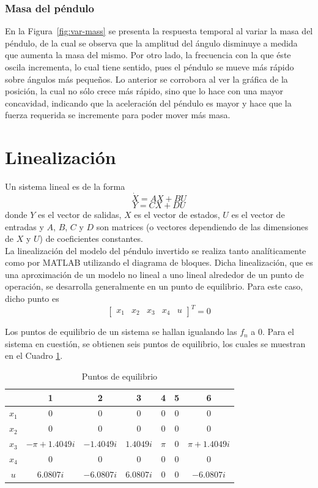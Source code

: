 \documentclass[journal]{IEEEtran}
\begin{document}
\subsubsection*{Masa del péndulo}
En la Figura~\ref{fig:var-mass} se presenta la respuesta temporal
al variar la masa del péndulo, de la cual se observa que la amplitud
del ángulo disminuye a medida que aumenta la masa del mismo. Por otro
lado, la frecuencia con la que éste oscila incrementa, lo cual tiene sentido,
pues el péndulo se mueve más rápido sobre ángulos más pequeños. Lo anterior se
corrobora al ver la gráfica de la posición, la cual no sólo crece más
rápido, sino que lo hace con una mayor concavidad, indicando que la
aceleración del péndulo es mayor y hace que la fuerza requerida
se incremente para poder mover más masa.


\section{Linealización}\label{sec:lin}

Un sistema lineal es de la forma
\[\dot{X}=AX+BU\]
\[Y=CX+DU\]
donde $Y$ es el vector de salidas, $X$ es el vector de estados, $U$ es el vector
de entradas y $A$, $B$, $C$ y $D$ son matrices (o vectores dependiendo de las
dimensiones de $X$ y $U$) de coeficientes constantes.\\

La linealización del modelo del péndulo invertido se realiza tanto analíticamente como por MATLAB utilizando el diagrama de bloques. Dicha linealización, que es una aproximación de un modelo no lineal a uno lineal alrededor de un punto de operación, se desarrolla generalmente en un punto de equilibrio. Para este caso, dicho punto es \[\begin{bmatrix}
x_1 & x_2 & x_3 & x_4 & u
\end{bmatrix}^T=0\]

Los puntos de equilibrio de un sistema se hallan igualando las $f_n$ a 0. Para el sistema en cuestión, se obtienen seis puntos de equilibrio, los cuales se muestran en el Cuadro \ref{tab: ptoseq}.


\begin{table}[ht!]
  \centering
  \caption{Puntos de equilibrio}\label{tab: ptoseq}
  \begin{tabular}{c|c|c|c|c|c|c}
    \hline
     & 1 & 2 & 3 & 4 & 5 & 6\\
    \hline
     $x_1$ & 0 & 0 & 0 & 0 & 0 & 0\\
     $x_2$ & 0 & 0 & 0 & 0 & 0 & 0\\
     $x_3$ & $- \pi + 1.4049i$ &  $-1.4049i$ & $1.4049i$ & $\pi$ & 0 & $\pi+1.4049i$\\
     $x_4$ & 0 & 0 & 0 & 0 & 0 & 0\\
     $u$ & $6.0807i$ & $- 6.0807i$ & $6.0807i$ & 0 & 0 & $- 6.0807i$\\ \hline
\end{tabular}
\end{table}
\end{document}
